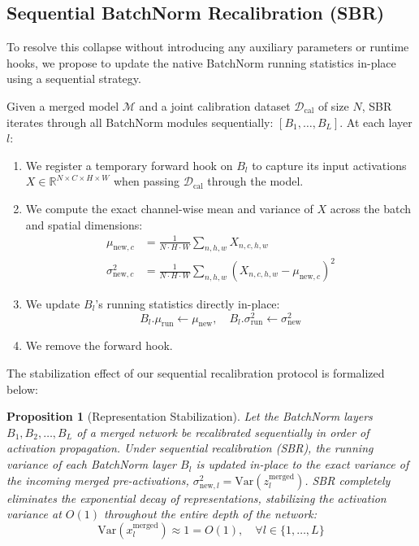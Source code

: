 \documentclass{article}
\theoremstyle{plain}
\newtheorem{proposition}[theorem]{Proposition}
\theoremstyle{definition}
\theoremstyle{remark}
\begin{document}
\subsection{Sequential BatchNorm Recalibration (SBR)}
To resolve this collapse without introducing any auxiliary parameters or runtime hooks, we propose to update the native BatchNorm running statistics in-place using a sequential strategy.

Given a merged model $\mathcal{M}$ and a joint calibration dataset $\mathcal{D}_{\text{cal}}$ of size $N$, SBR iterates through all BatchNorm modules sequentially: $[B_1, \dots, B_L]$. At each layer $l$:
\begin{enumerate}
    \item We register a temporary forward hook on $B_l$ to capture its input activations $X \in \mathbb{R}^{N \times C \times H \times W}$ when passing $\mathcal{D}_{\text{cal}}$ through the model.
    \item We compute the exact channel-wise mean and variance of $X$ across the batch and spatial dimensions:
    \begin{align}
    \mu_{\text{new}, c} &= \frac{1}{N \cdot H \cdot W} \sum_{n, h, w} X_{n, c, h, w} \\
    \sigma^2_{\text{new}, c} &= \frac{1}{N \cdot H \cdot W} \sum_{n, h, w} (X_{n, c, h, w} - \mu_{\text{new}, c})^2
    \end{align}
    \item We update $B_l$'s running statistics directly in-place:
    \begin{equation}
    B_l.\mu_{\text{run}} \leftarrow \mu_{\text{new}}, \quad B_l.\sigma^2_{\text{run}} \leftarrow \sigma^2_{\text{new}}
    \end{equation}
    \item We remove the forward hook.
\end{enumerate}
The stabilization effect of our sequential recalibration protocol is formalized below:

\begin{proposition}[Representation Stabilization]
\label{prop:stabilization}
Let the BatchNorm layers $B_1, B_2, \dots, B_L$ of a merged network be recalibrated sequentially in order of activation propagation. Under sequential recalibration (SBR), the running variance of each BatchNorm layer $B_l$ is updated in-place to the exact variance of the incoming merged pre-activations, $\sigma^2_{\text{new}, l} = \text{Var}(z_l^{\text{merged}})$. SBR completely eliminates the exponential decay of representations, stabilizing the activation variance at $O(1)$ throughout the entire depth of the network:
\begin{equation}
\text{Var}(x_l^{\text{merged}}) \approx 1 = O(1), \quad \forall l \in \{1, \dots, L\}
\end{equation}
\end{proposition}
\end{document}

